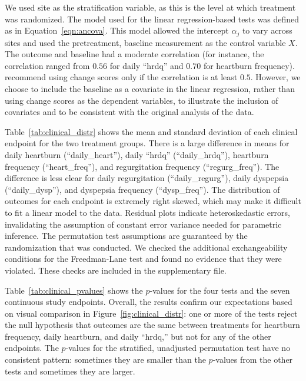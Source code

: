 \documentclass[12pt]{article}
\begin{document}
We used site as the stratification variable, as this is the level at which treatment was randomized.
The model used for the linear regression-based tests was defined as in Equation~\ref{eqn:ancova}.
This model allowed the intercept $\alpha_j$ to vary across sites and used the pretreatment, baseline measurement as the control variable $X$.
The outcome and baseline had a moderate correlation (for instance, the correlation ranged from $0.56$ for daily ``hrdq'' and $0.70$ for heartburn frequency).
\cite{frison_repeated_1992} recommend using change scores only if the correlation is at least $0.5$.
However, we choose to include the baseline as a covariate in the linear regression, rather than using change scores as the dependent variables, to illustrate the inclusion of covariates and to be consistent with the original analysis of the data.

Table~\ref{tab:clinical_distr} shows the mean and standard deviation of each clinical endpoint for the two treatment groups.
There is a large difference in means for daily heartburn (``daily\_heart''), daily ``hrdq'' (``daily\_hrdq''), heartburn frequency (``heart\_freq''), and regurgitation frequency (``regurg\_freq'').
The difference is less clear for daily regurgitation (``daily\_regurg''), daily dyspepsia (``daily\_dysp''), and dyspepsia frequency (``dysp\_freq'').
The distribution of outcomes for each endpoint is extremely right skewed, which may make it difficult to fit a linear model to the data.
Residual plots indicate heteroskedastic errors, invalidating the assumption of constant error variance needed for parametric inference.
The permutation test assumptions are guaranteed by the randomization that was conducted.
We checked the additional exchangeability conditions for the Freedman-Lane test and found no evidence that they were violated. 
These checks are included in the supplementary file.

Table~\ref{tab:clinical_pvalues} shows the $p$-values for the four tests and the seven continuous study endpoints.
Overall, the results confirm our expectations based on visual comparison in Figure~\ref{fig:clinical_distr}:
one or more of the tests reject the null hypothesis that outcomes are the same between treatments for heartburn frequency, daily heartburn, and daily ``hrdq,''
but not for any of the other endpoints.
The $p$-values for the stratified, unadjusted permutation test have no consistent pattern: sometimes they are smaller than the $p$-values from the other tests and sometimes they are larger.
\end{document}
